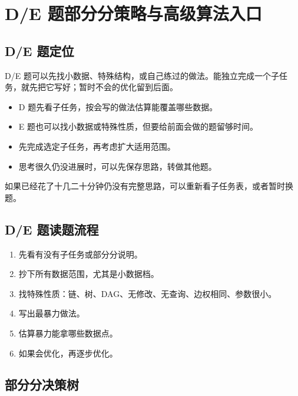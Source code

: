 \chapter{D/E 题部分分策略与高级算法入口}\label{ch:08}

\section{D/E 题定位}\label{sec:08-1}

D/E 题可以先找小数据、特殊结构，或自己练过的做法。能独立完成一个子任务，就先把它写好；暂时不会的优化留到后面。

\begin{itemize}
  \item D 题先看子任务，按会写的做法估算能覆盖哪些数据。
  \item E 题也可以找小数据或特殊性质，但要给前面会做的题留够时间。
  \item 先完成选定子任务，再考虑扩大适用范围。
  \item 思考很久仍没进展时，可以先保存思路，转做其他题。
\end{itemize}

如果已经花了十几二十分钟仍没有完整思路，可以重新看子任务表，或者暂时换题。

\section{D/E 题读题流程}\label{sec:08-2}

\begin{enumerate}
  \item 先看有没有子任务或部分分说明。
  \item 抄下所有数据范围，尤其是小数据档。
  \item 找特殊性质：链、树、DAG、无修改、无查询、边权相同、参数很小。
  \item 写出最暴力做法。
  \item 估算暴力能拿哪些数据点。
  \item 如果会优化，再逐步优化。
\end{enumerate}

\section{部分分决策树}\label{sec:08-3}

